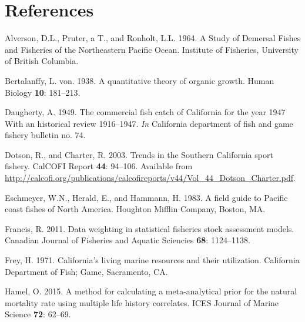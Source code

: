 \documentclass[12pt,]{article}
\begin{document}
\FloatBarrier

\FloatBarrier

\FloatBarrier

\FloatBarrier

\FloatBarrier

\FloatBarrier

\FloatBarrier

\FloatBarrier

\newpage

\color{black}

\section*{References}\label{references}

\renewcommand{\thepage}{}

\hypertarget{refs}{}
\hypertarget{ref-Alverson1964}{}
Alverson, D.L., Pruter, a T., and Ronholt, L.L. 1964. A Study of
Demersal Fishes and Fisheries of the Northeastern Pacific Ocean.
Institute of Fisheries, University of British Columbia.

\hypertarget{ref-vonB1938}{}
Bertalanffy, L. von. 1938. A quantitative theory of organic growth.
Human Biology \textbf{10}: 181--213.

\hypertarget{ref-Daugherty1949}{}
Daugherty, A. 1949. The commercial fish catch of California for the year
1947 With an historical review 1916--1947. \emph{In} California
department of fish and game fishery bulletin no. 74.

\hypertarget{ref-Dotson2003}{}
Dotson, R., and Charter, R. 2003. Trends in the Southern California
sport fishery. CalCOFI Report \textbf{44}: 94--106. Available from
\url{http://calcofi.org/publications/calcofireports/v44/Vol_44_Dotson_Charter.pdf}.

\hypertarget{ref-Eschmeyer1983}{}
Eschmeyer, W.N., Herald, E., and Hammann, H. 1983. A field guide to
Pacific coast fishes of North America. Houghton Mifflin Company, Boston,
MA.

\hypertarget{ref-Francis2011}{}
Francis, R. 2011. Data weighting in statistical fisheries stock
assessment models. Canadian Journal of Fisheries and Aquatic Sciencies
\textbf{68}: 1124--1138.

\hypertarget{ref-Frey1971}{}
Frey, H. 1971. California's living marine resources and their
utilization. California Department of Fish; Game, Sacramento, CA.

\hypertarget{ref-Hamel2015}{}
Hamel, O. 2015. A method for calculating a meta-analytical prior for the
natural mortality rate using multiple life history correlates. ICES
Journal of Marine Science \textbf{72}: 62--69.
\end{document}
